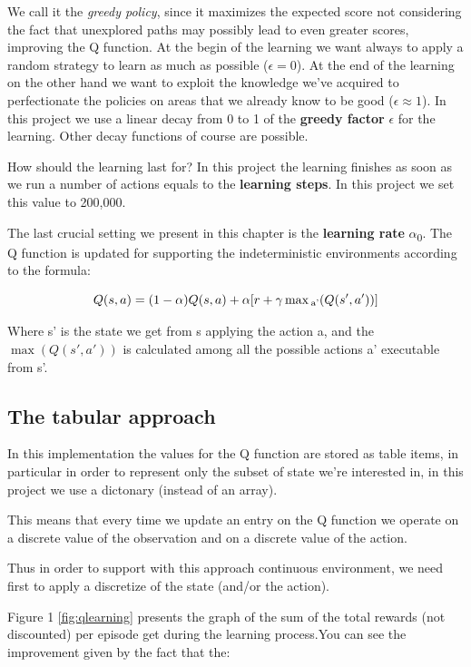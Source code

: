 \documentclass{article}
\begin{document}
We call it the \emph{greedy policy}, since it maximizes the expected score not considering the fact that unexplored paths may
possibly lead to even greater scores, improving the Q function.
At the begin of the learning we want always to apply a random strategy to learn as much as possible ($\epsilon = 0$).
At the end of the learning on the other hand we want to exploit the knowledge we've acquired to perfectionate the policies on areas
that we already know to be good ($\epsilon \approx 1$).
In this project we use a linear decay from 0 to 1 of the \textbf{greedy factor} $\epsilon$ for the learning.
Other decay functions of course are possible.

How should the learning last for? In this project the learning finishes as soon as we run a number of actions
equals to the \textbf{learning steps}. In this project we set this value to 200,000.

The last crucial setting we present in this chapter is the \textbf{learning rate} $\alpha$\textsubscript{0}.
The Q function is updated for supporting the indeterministic environments according to the formula:

\begin{equation}
  Q(s,a) = (1 - \alpha) Q(s,a) + \alpha [r + \gamma \max\textsubscript{a'} (Q(s',a'))]
\end{equation}

Where s' is the state we get from s applying the action a, 
and the $\max (Q(s',a'))$ is calculated among all the possible actions a' executable from s'.

\subsection{The tabular approach}

In this implementation the values for the Q function are stored as table items,
in particular in order to represent only the subset of state we're interested in,  
in this project we use a dictonary (instead of an array).

This means that every time we update an entry on the Q function we operate on a discrete value of the
observation and on a discrete value of the action.

Thus in order to support with this approach continuous environment,
we need first to apply a discretize of the state (and/or the action).

Figure 1 \ref{fig:qlearning} presents the graph of the sum of the total rewards (not discounted) per episode get 
during the learning process.You can see the improvement given by the fact that the:
\end{document}
